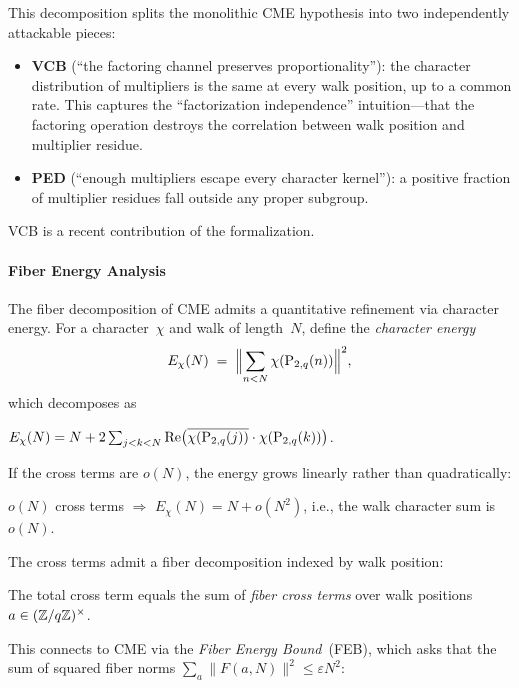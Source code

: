 This decomposition splits the monolithic CME hypothesis into two
independently attackable pieces:
\begin{itemize}[nosep]
\item \textbf{VCB} (``the factoring channel preserves proportionality''):
  the character distribution of multipliers is the same at every walk
  position, up to a common rate.  This captures the ``factorization
  independence'' intuition---that the factoring operation destroys the
  correlation between walk position and multiplier residue.
\item \textbf{PED} (``enough multipliers escape every character kernel''):
  a positive fraction of multiplier residues fall outside any proper
  subgroup.
\end{itemize}
VCB is a recent contribution of the formalization.

\paragraph{Fiber Energy Analysis}
\label{sec:fiber-energy}

The fiber decomposition of CME admits a quantitative refinement via
character energy.  For a character~$\chi$ and walk of length~$N$,
define the \emph{character energy}
\[
  E_\chi(N) \;=\; \Bigl\|\sum_{n<N} \chi(\mathrm{P}_{2,q}(n))\Bigr\|^2,
\]
which decomposes as
\begin{theorem}
$E_\chi(N) = N + 2\sum_{j<k<N} \mathrm{Re}\bigl(
  \overline{\chi(\mathrm{P}_{2,q}(j))} \cdot \chi(\mathrm{P}_{2,q}(k))\bigr)$.
\end{theorem}
\noindent If the cross terms are $o(N)$, the energy grows linearly
rather than quadratically:
\begin{theorem}
$o(N)$ cross terms $\Rightarrow$ $E_\chi(N) = N + o(N^2)$,
i.e., the walk character sum is $o(N)$.
\end{theorem}

The cross terms admit a fiber decomposition indexed by walk position:
\begin{theorem}
The total cross term equals the sum of \emph{fiber cross terms} over
walk positions~$a \in (\mathbb{Z}/q\mathbb{Z})^\times$.
\end{theorem}

This connects to CME via the \emph{Fiber Energy Bound}~(FEB),
which asks that the sum of squared fiber norms
$\sum_a \|F(a,N)\|^2 \leq \varepsilon N^2$:

